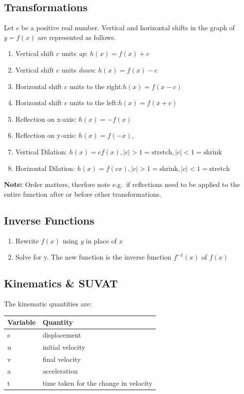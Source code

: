 \subsection{Transformations}
Let \(c\) be a positive real number. Vertical and horizontal shifts in the graph of
\(y=f(x)\) are represented as follows.
\begin{enumerate}
	\item Vertical shift \(c\) units \emph{up}: \quad \( h(x) = f(x) + c \)
	\item Vertical shift \(c\) units \emph{down}: \quad \(h(x) =f(x) - c\)
	\item Horizontal shift \(c\) units to the right:\quad \(h(x) =f(x-c)\)
	\item Horizontal shift \(c\) units to the left:\quad  \(h(x) = f(x+c)\)
	\item Reflection on x-axis: \quad \(h(x)=-f(x) \)
	\item Reflection on y-axis: \quad \(h(x)=f(-x),  \)
	\item Vertical Dilation: \quad  \(h(x)=cf(x), |c| > 1 = \mathrm{ stretch}, |c| < 1 = \mathrm{ shrink }\)
	\item Horizontal Dilation: \quad \(h(x)=f(cx), |c| > 1 = \mathrm{ shrink}, |c| < 1 = \mathrm{ stretch }\)
\end{enumerate}

\textbf{Note:} Order matters, therfore note e.g.\ if reflections need to be applied to the entire function after or before other transformations.

\subsection{Inverse Functions}
\begin{enumerate}
	\item Rewrite \(f(x)\) using \emph{y} in place of \emph{x}
	\item Solve for y. The new function is the inverse function \(f^{-1}(x)\) of \(f(x)\)
\end{enumerate}

\subsection{Kinematics \& SUVAT}
The kinematic quantities are:
\begin{table}[H]
	\centering
	\begin{tabular}{@{}ll@{}}
		\toprule
		Variable & Quantity                              \\ \midrule
		s        & displacement                          \\
		u        & initial velocity                      \\
		v        & final velocity                        \\
		a        & acceleration                          \\
		t        & time taken for the change in velocity \\ \bottomrule
	\end{tabular}
\end{table}

